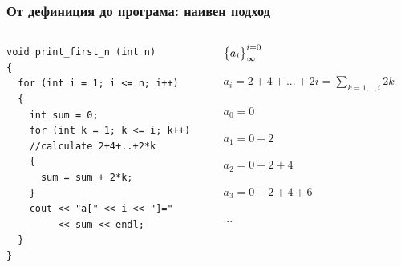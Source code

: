 \documentclass{beamer}
\begin{document}
\begin{frame}[fragile]
\frametitle{От дефиниция до програма: наивен подход}


\begin{columns}[t]
  \begin{column}{0.6\textwidth}

\begin{lstlisting}
void print_first_n (int n)
{
  for (int i = 1; i <= n; i++)
  {
    int sum = 0;  
    for (int k = 1; k <= i; k++)
    //calculate 2+4+..+2*k
    {
      sum = sum + 2*k;
    }
    cout << "a[" << i << "]=" 
         << sum << endl;
  }
}
\end{lstlisting}


  \end{column}
  \begin{column}{0.4\textwidth}
\begin{flushleft}

  $\big{\{}a_i\big{\}}_\infty^{i=0}$

  \vspace{10px}

  $a_i = 2 + 4 + ... + 2i = \sum\limits_{k=1,..,i}2k$


  \vspace{30px}

  $a_0 = 0$

  $a_1 = 0 + 2$

  $a_2 = 0 + 2 + 4$

  $a_3 = 0 + 2 + 4 + 6$ 

  ...


\end{flushleft}
  \end{column}
\end{columns}

\end{frame}
\end{document}
